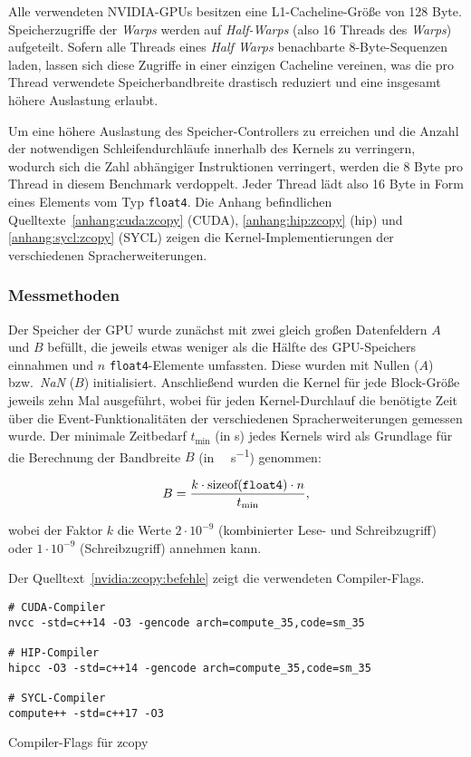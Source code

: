 Alle verwendeten NVIDIA-GPUs besitzen eine L1-Cacheline-Größe von \num{128}
Byte. Speicherzugriffe der \textit{Warps} werden auf \textit{Half-Warps} (also
\num{16} Threads des \textit{Warps}) aufgeteilt. Sofern alle Threads eines
\textit{Half Warps} benachbarte \num{8}-Byte-Sequenzen laden, lassen sich diese
Zugriffe in einer einzigen Cacheline vereinen, was die pro Thread verwendete
Speicherbandbreite drastisch reduziert und eine insgesamt höhere Auslastung
erlaubt.

Um eine höhere Auslastung des Speicher-Controllers zu erreichen und die Anzahl
der notwendigen Schleifendurchläufe innerhalb des Kernels zu verringern, wodurch
sich die Zahl abhängiger Instruktionen verringert, werden die \num{8} Byte pro
Thread in diesem Benchmark verdoppelt. Jeder Thread lädt also \num{16} Byte in
Form eines Elements vom Typ \texttt{float4}. Die Anhang befindlichen
Quelltexte~\ref{anhang:cuda:zcopy} (CUDA), \ref{anhang:hip:zcopy} (\gls{hip})
und \ref{anhang:sycl:zcopy} (SYCL) zeigen die Kernel-Implementierungen der
verschiedenen Spracherweiterungen.

\subsubsection{Messmethoden}
\label{nvidia:zcopy:methoden}

Der Speicher der GPU wurde zunächst mit zwei gleich großen Datenfeldern $A$ und
$B$ befüllt, die jeweils etwas weniger als die Hälfte des GPU-Speichers
einnahmen und $n$ \texttt{float4}-Elemente umfassten. Diese wurden mit Nullen
($A$) bzw.\ \textit{NaN} ($B$) initialisiert. Anschließend wurden die Kernel für
jede Block-Größe jeweils zehn Mal ausgeführt, wobei für jeden Kernel-Durchlauf
die benötigte Zeit über die Event-Funktionalitäten der verschiedenen
Spracherweiterungen gemessen wurde. Der minimale Zeitbedarf $t_{\text{min}}$
(in \si{\second}) jedes Kernels wird als Grundlage für die Berechnung der
Bandbreite $B$ (in \si{\gibi\byte\per\second}) genommen:

\[
    B = \frac{k \cdot \text{sizeof(\texttt{float4})} \cdot n}{t_\text{min}},
\]

wobei der Faktor $k$ die Werte $2 \cdot 10^{-9}$ (kombinierter Lese- und
Schreibzugriff) oder $1 \cdot 10^{-9}$ (Schreibzugriff) annehmen kann.

Der Quelltext~\ref{nvidia:zcopy:befehle} zeigt die verwendeten Compiler-Flags.


\begin{code}
    \begin{verbatim}
# CUDA-Compiler
nvcc -std=c++14 -O3 -gencode arch=compute_35,code=sm_35

# HIP-Compiler
hipcc -O3 -std=c++14 -gencode arch=compute_35,code=sm_35

# SYCL-Compiler
compute++ -std=c++17 -O3
    \end{verbatim}
    \caption{Compiler-Flags für zcopy}
    \label{nvidia:zcopy:befehle}
\end{code}


